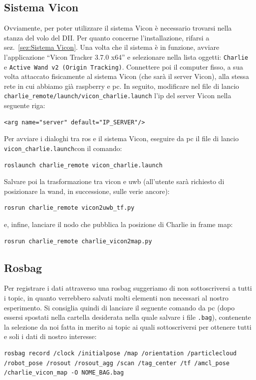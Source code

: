 \subsection*{Sistema Vicon}
Ovviamente, per poter utilizzare il sistema Vicon è necessario trovarsi nella stanza del volo del DII. 
Per quanto concerne l'installazione, rifarsi a sez.~\ref{sez:Sistema Vicon}. 
Una volta che il sistema è in funzione, avviare l'applicazione ``Vicon Tracker 3.7.0 x64'' e selezionare nella lista oggetti: \texttt{Charlie} e \texttt{Active Wand v2 (Origin Tracking)}. 
Connettere poi il computer fisso, a sua volta attaccato fisicamente al sistema Vicon (che sarà il server Vicon), alla stessa rete in cui abbiamo già raspberry e pc. In seguito, modificare nel file di lancio \texttt{charlie\_remote/launch/vicon\_charlie.launch} l'ip del server Vicon nella seguente riga:
\begin{lstlisting}[style=xml, firstnumber=6]
	<arg name="server" default="IP_SERVER"/>
\end{lstlisting}

Per avviare i dialoghi tra ros e il sistema Vicon, eseguire da pc il file di lancio \verb|vicon_charlie.launch|con il comando:
\begin{lstlisting}[style=bashPC]
	roslaunch charlie_remote vicon_charlie.launch
\end{lstlisting}

Salvare poi la trasformazione tra vicon e uwb (all'utente sarà richiesto di posizionare la wand, in successione, sulle verie ancore):
\begin{lstlisting}[style=bashPC]
	rosrun charlie_remote vicon2uwb_tf.py
\end{lstlisting}

e, infine, lanciare il nodo che pubblica la posizione di Charlie in frame map:
\begin{lstlisting}[style=bashPC]
	rosrun charlie_remote charlie_vicon2map.py
\end{lstlisting}


\subsection*{Rosbag}
Per registrare i dati attraverso una rosbag suggeriamo di non sottoscriversi a tutti i topic, in quanto verrebbero salvati molti elementi non necessari al nostro esperimento. Si consiglia quindi di lanciare il seguente comando da pc (dopo essersi spostati nella cartella desiderata nella quale salvare i file \verb|.bag|), contenente la selezione da noi fatta in merito ai topic ai quali sottoscriversi per ottenere tutti e soli i dati di nostro interesse:
\begin{lstlisting}[style=bashPC]
	rosbag record /clock /initialpose /map /orientation /particlecloud /robot_pose /rosout /rosout_agg /scan /tag_center /tf /amcl_pose /charlie_vicon_map -O NOME_BAG.bag
\end{lstlisting}

